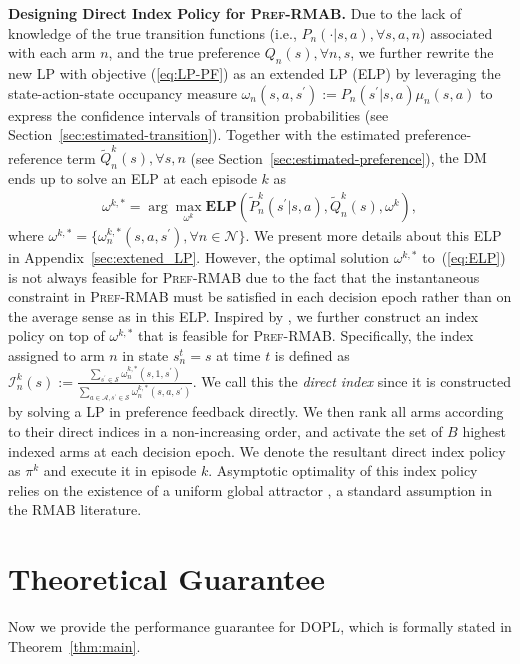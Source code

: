 \documentclass{article} %
\def\eqref#1{equation~\ref{#1}}
\newcommand{\RMABPF}{\textsc{Pref-RMAB}\xspace}
\newcommand{\DOPL}{\textsc{DOPL}\xspace}
\newcommand{\cA}{\mathcal{A}}
\newcommand{\cS}{\mathcal{S}}
\newcommand{\cN}{\mathcal{N}}
\renewcommand{\eqref}[1]{(\ref{#1})}
\begin{document}
\textbf{Designing Direct Index Policy for \RMABPF.} Due to the lack of knowledge of the true transition functions (i.e., $P_n(\cdot|s,a), \forall s,a, n$) associated with each arm $n$, and the true preference $Q_n(s),\forall n, s$, we further rewrite the new LP with objective \eqref{eq:LP-PF} as an extended LP (ELP) by leveraging the state-action-state occupancy measure $\omega_n(s, a, s^\prime):=P_n(s^\prime|s,a)\mu_n(s,a)$ to express the confidence intervals of transition probabilities (see Section~\ref{sec:estimated-transition}). Together with the estimated preference-reference term $\tilde{Q}^k_n(s), \forall s, n$ (see Section~\ref{sec:estimated-preference}), {the DM ends up to solve an ELP at each episode $k$ as 
\begin{align}\label{eq:ELP}
    \omega^{k,*} =\arg\max_{\omega^k}{\textbf{ELP}}(\tilde{P}_n^k(s^\prime|s,a), \tilde{Q}^k_n(s),\omega^k),
\end{align}
where $\omega^{k,*}=\{\omega_n^{k,*}(s,a,s^\prime), \forall n\in\cN\}$. We present more details about this ELP in Appendix~\ref{sec:extened_LP}. However, the optimal solution $\omega^{k,*}$ to~\eqref{eq:ELP} is not always feasible for \RMABPF due to the fact that the instantaneous constraint in \RMABPF must be satisfied in each decision epoch rather than on the average sense as in this ELP. Inspired by \cite{verloop2016asymptotically, zhang2021restless, xiong2022Nips}, we further construct an index policy on top of  $\omega^{k,*}$ that is feasible for \RMABPF. Specifically, the index assigned to arm $n$ in state $s_n^t=s$ at time $t$ is defined as $\mathcal{I}^k_n(s):=\frac{\sum_{s^\prime\in\cS}\omega_n^{k,*}(s,1,s^\prime)}{\sum_{a\in\cA,s^\prime\in\cS}\omega_n^{k,*}(s,a,s^\prime)}$. We call this the \textit{direct index} since it is constructed by solving a LP in preference feedback directly. We then rank all arms according to their direct indices in a non-increasing order, and activate the set of $B$ highest indexed arms at each decision epoch. We denote the resultant direct index policy as $\pi^k$ and execute it in episode $k.$} Asymptotic optimality of this index policy relies on the existence of a uniform global attractor \citep{gast2024linear}, a standard assumption in the RMAB literature.








\section{Theoretical Guarantee}\label{sec:theory}
Now we provide the performance guarantee for \DOPL, which is formally stated in Theorem~\ref{thm:main}.
\end{document}
